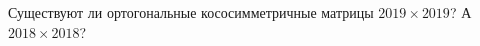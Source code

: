\documentclass{article}
\begin{document}
Существуют ли ортогональные кососимметричные матрицы $2019 \times 2019$? А $2018 \times 2018$?
\end{document}
